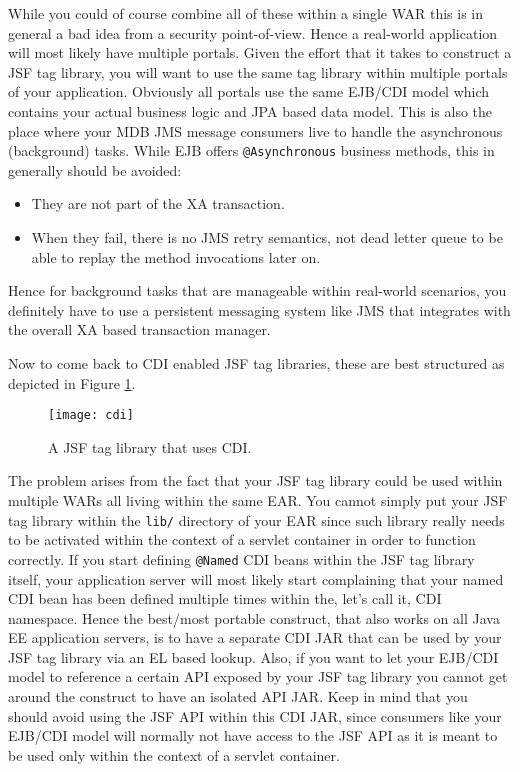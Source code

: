 While you could of course combine all of these within a single WAR this is in general a bad idea from a security point-of-view.
Hence a real-world application will most likely have multiple portals.
Given the effort that it takes to construct a JSF tag library, you will want to use the same tag library within multiple portals of your application.
Obviously all portals use the same EJB/CDI model which contains your actual business logic and JPA based data model.
This is also the place where your MDB JMS message consumers live to handle the asynchronous (background) tasks.
While EJB offers \texttt{@Asynchronous}  business methods, this in generally should be avoided:
\begin{itemize}
	\item They are not part of the XA transaction.
	\item When they fail, there is no JMS retry semantics, not dead letter queue to be able to replay the method invocations later on.
\end{itemize}
Hence for background tasks that are manageable within real-world scenarios, you definitely have to use a persistent messaging system like JMS that integrates with the overall XA based transaction manager.

Now to come back to CDI enabled JSF tag libraries, these are best structured as depicted in Figure \ref{fig:cdi}.
\begin{figure}[htbp]
	\begin{center}
		\texttt{[image: cdi]}
		\caption{A JSF tag library that uses CDI.}
		\label{fig:cdi}
	\end{center}
\end{figure}
The problem arises from the fact that your JSF tag library could be used within multiple WARs all living within the same EAR.
You cannot simply put your JSF tag library within the \texttt{lib/} directory of your EAR since such library really needs to be activated within the context of a servlet container in order to function correctly.
If you start defining \texttt{@Named} CDI beans within the JSF tag library itself, your application server will most likely start complaining that your named CDI bean has been defined multiple times within the, let's call it, CDI namespace.
Hence the best/most portable construct, that also works on all Java EE application servers, is to have a separate CDI JAR that can be used by your JSF tag library via an EL based lookup.
Also, if you want to let your EJB/CDI model to reference a certain API exposed by your JSF tag library you cannot get around the construct to have an isolated API JAR.
Keep in mind that you should avoid using the JSF API within this CDI JAR, since consumers like your EJB/CDI model will normally not have access to the JSF API as it is meant to be used only within the context of a servlet container.

